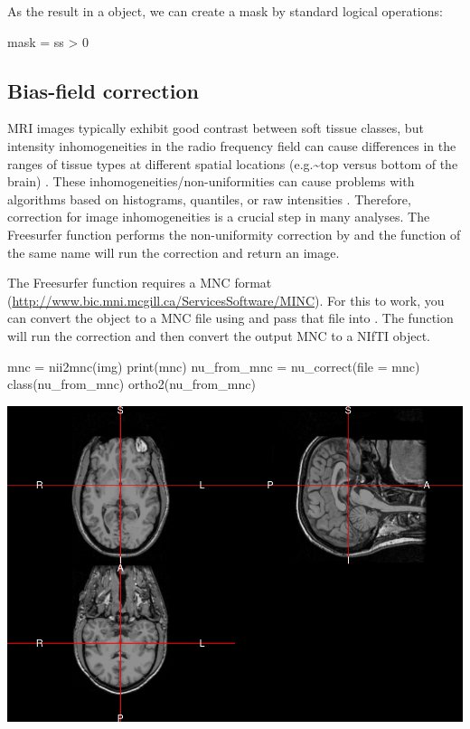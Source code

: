 As the result in a  object, we can create a mask by standard
logical operations:

\begin{Schunk}
\begin{Sinput}
mask = ss > 0
\end{Sinput}
\end{Schunk}

\subsection{Bias-field correction}

MRI images typically exhibit good contrast between soft tissue classes,
but intensity inhomogeneities in the radio frequency field can cause
differences in the ranges of tissue types at different spatial locations
(e.g.\textasciitilde{}top versus bottom of the brain) . These
inhomogeneities/non-uniformities can cause problems with algorithms
based on histograms, quantiles, or raw intensities
\citep{zhang_segmentation_2001}. Therefore, correction for image
inhomogeneities is a crucial step in many analyses. The Freesurfer
function  performs the non-uniformity correction by
\citet{sled_nonparametric_1998} and the  function of the
same name will run the correction and return an image.

The Freesurfer  function requires a MNC format
(\url{http://www.bic.mni.mcgill.ca/ServicesSoftware/MINC}). For this to
work, you can convert the  object to a MNC file using
 and pass that file into . The
  function will run the correction and
then convert the output MNC to a NIfTI object.

\begin{Schunk}
\begin{Sinput}
mnc = nii2mnc(img)
print(mnc)
nu_from_mnc = nu_correct(file = mnc)
class(nu_from_mnc)
ortho2(nu_from_mnc)
\end{Sinput}

\includegraphics{Freesurfer_files/figure-latex/nu_correct_mcn2nii-1} \end{Schunk}

